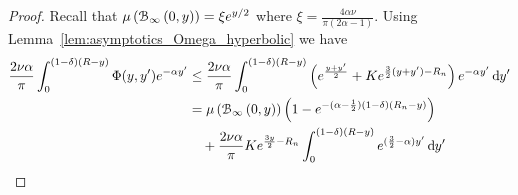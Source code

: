 \begin{proof}
Recall that $\mu\left({\mathcal B}_{\infty}\left(0,y\right)\right) = \xi e^{y/2}$ where $\xi = \frac{4\alpha\nu}{\pi(2\alpha - 1)}$. Using Lemma~\ref{lem:asymptotics_Omega_hyperbolic} we have 
\begin{align*}
	\frac{2\nu \alpha}{\pi} \int_0^{(1-\delta)(R-y)} \Phi(y,y^\prime) e^{-\alpha y^\prime} 
	&\le \frac{2\nu \alpha}{\pi} \int_{0}^{(1-\delta)(R-y)} \left(e^{\frac{y + y^\prime}{2}} + K e^{\frac{3}{2}(y + y^\prime) - R_n}\right)
		e^{-\alpha y^\prime} \operatorname{\mathrm{d}\hspace{-2pt}} y^\prime\\
	&= \mu\left({\mathcal B}_{\infty}\left(0,y\right)\right)\left(1 - e^{-(\alpha - \frac{1}{2})(1-\delta)(R_n - y)}\right) \\
	&\hspace{10pt}+ \frac{2\nu \alpha}{\pi} K e^{\frac{3 y}{2} - R_n}\int_0^{(1-\delta)(R-y)} e^{(\frac{3}{2} - \alpha)y^\prime} \operatorname{\mathrm{d}\hspace{-2pt}} y^\prime
\end{align*}


\end{proof}
